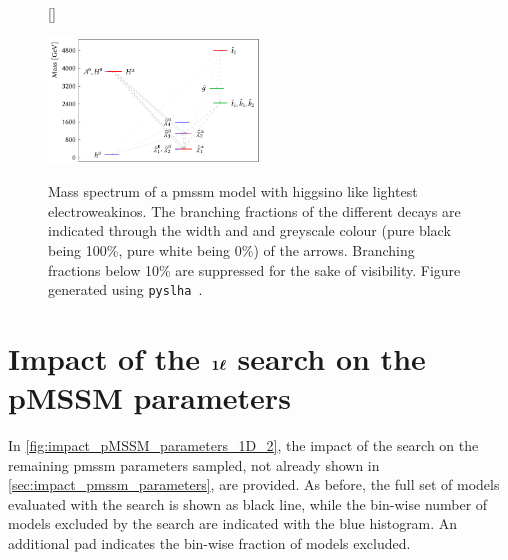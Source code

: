 \begin{figure}[h]
[\FBwidth]
{\caption{Mass spectrum of a \gls{pmssm} model with higgsino like lightest electroweakinos. The branching fractions of the different decays are indicated through the width and and greyscale colour (pure black being 100\%, pure white being 0\%) of the arrows. Branching fractions below 10\% are suppressed for the sake of visibility. Figure generated using \texttt{pyslha}~\cite{pyslha:2013jua}.}\label{fig:higgsino_spectrum}}
{\includegraphics[width=0.50\textwidth]{thesis_plot_6898.pdf}}
\end{figure}

\FloatBarrier

\section[Impact of the \onelepton search on the pMSSM parameters]{Impact of the $\makemebold{1\ell}$ search on the pMSSM parameters}

In \cref{fig:impact_pMSSM_parameters_1D_2}, the impact of the \onelepton search on the remaining \gls{pmssm} parameters sampled, not already shown in \cref{sec:impact_pmssm_parameters}, are provided. As before, the full set of models evaluated with the \onelepton search is shown as black line, while the bin-wise number of models excluded by the search are indicated with the blue histogram. An additional pad indicates the bin-wise fraction of models excluded.

